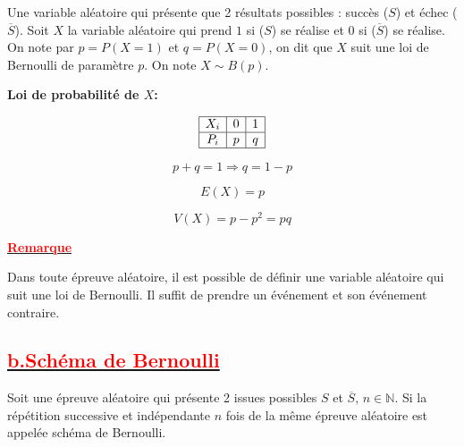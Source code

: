 \documentclass[12pt,a4paper]{article}
\begin{document}
Une variable aléatoire qui présente que 2 résultats possibles : succès (\(S\)) et échec (\(\overline{S}\)). 
Soit \(X\) la variable aléatoire qui prend \(1\) si (\(S\)) se réalise et \(0\) si (\(\overline{S}\)) se réalise.
On note par \(p = P(X = 1)\) et \(q = P(X = 0)\), on dit que \(X\) suit une loi de Bernoulli de paramètre \(p\).
On note \(X \sim B(p)\).

\textbf{Loi de probabilité de \( X \):}

\[
\begin{array}{|c|c|c|}
\hline
X_i & 0 & 1 \\
\hline
P_i & p & q \\
\hline
\end{array}
\]

\[
p + q = 1 \Rightarrow q = 1 - p
\]

\[
E(X) = p
\]

\[
V(X) = p - p^2 = p q
\]

\underline{\textbf{\textcolor{red}{Remarque}}}

Dans toute épreuve aléatoire, il est possible de définir une variable aléatoire qui suit une loi de Bernoulli. Il suffit de prendre un événement et son événement contraire.

\subsection*{\underline{\textbf{\textcolor{red}{b.Schéma de Bernoulli}}}}

Soit une épreuve aléatoire qui présente 2 issues possibles \( S \) et \( \overline{S} \), \( n \in \mathbb{N} \). Si la répétition successive et indépendante \( n \) fois de la même épreuve aléatoire est appelée schéma de Bernoulli.
\end{document}
